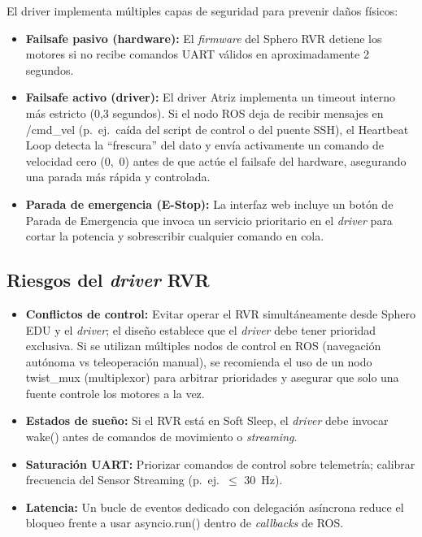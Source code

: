 \documentclass[12pt]{article}
\numberwithin{figure}{section}
\numberwithin{table}{section}
\def\code#1{#1}%
\newcommand{\code}[1]{\textcolor{codeblue}{\url{#1}}}
\begin{document}
El driver implementa múltiples capas de seguridad para prevenir daños físicos:

\begin{itemize}
    \item \textbf{Failsafe pasivo (hardware):} El \textit{firmware} del Sphero RVR detiene los motores si no recibe comandos UART válidos en aproximadamente 2 segundos.
    \item \textbf{Failsafe activo (driver):} El driver Atriz implementa un timeout interno más estricto (0,3 segundos). Si el nodo ROS deja de recibir mensajes en \code{/cmd\_vel} (p.\ ej.\ caída del script de control o del puente SSH), el Heartbeat Loop detecta la ``frescura'' del dato y envía activamente un comando de velocidad cero (0,~0) antes de que actúe el failsafe del hardware, asegurando una parada más rápida y controlada.
    \item \textbf{Parada de emergencia (E-Stop):} La interfaz web incluye un botón de Parada de Emergencia que invoca un servicio prioritario en el \textit{driver} para cortar la potencia y sobrescribir cualquier comando en cola.
\end{itemize}


\subsection{Riesgos del \textit{driver} RVR}

\begin{itemize}
    \item \textbf{Conflictos de control:} Evitar operar el RVR simultáneamente desde Sphero EDU y el \textit{driver}; el diseño establece que el \textit{driver} debe tener prioridad exclusiva. Si se utilizan múltiples nodos de control en ROS (navegación autónoma vs teleoperación manual), se recomienda el uso de un nodo \code{twist\_mux} (multiplexor) para arbitrar prioridades y asegurar que solo una fuente controle los motores a la vez.
    \item \textbf{Estados de sueño:} Si el RVR está en Soft Sleep, el \textit{driver} debe invocar \code{wake()} antes de comandos de movimiento o \textit{streaming}.
    \item \textbf{Saturación UART:} Priorizar comandos de control sobre telemetría; calibrar frecuencia del Sensor Streaming (p.\ ej.\ $\leq$ 30~Hz).
    \item \textbf{Latencia:} Un bucle de eventos dedicado con delegación asíncrona reduce el bloqueo frente a usar \code{asyncio.run()} dentro de \textit{callbacks} de ROS.
\end{itemize}
\end{document}
